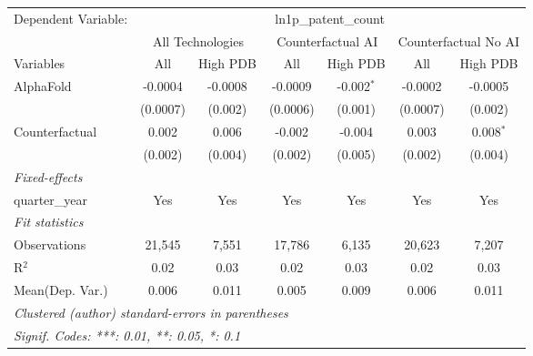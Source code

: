\begingroup
\centering
\begin{tabular}{lcccccc}
   \tabularnewline \midrule \midrule
   Dependent Variable: & \multicolumn{6}{c}{ln1p\_patent\_count}\\
 & \multicolumn{2}{c}{All Technologies} & \multicolumn{2}{c}{Counterfactual AI} & \multicolumn{2}{c}{Counterfactual No AI} \\
\cmidrule(lr){1-1}\cmidrule(lr){2-3} \cmidrule(lr){4-5} \cmidrule(lr){6-7}
Variables & \multicolumn{1}{c}{All} & \multicolumn{1}{c}{High PDB} & \multicolumn{1}{c}{All} & \multicolumn{1}{c}{High PDB} & \multicolumn{1}{c}{All} & \multicolumn{1}{c}{High PDB} \\
\cmidrule(lr){1-1}\cmidrule(lr){2-2} \cmidrule(lr){3-3} \cmidrule(lr){4-4} \cmidrule(lr){5-5} \cmidrule(lr){6-6} \cmidrule(lr){7-7}
   AlphaFold      & -0.0004  & -0.0008 & -0.0009  & -0.002$^{*}$ & -0.0002  & -0.0005\\   
                  & (0.0007) & (0.002) & (0.0006) & (0.001)      & (0.0007) & (0.002)\\   
   Counterfactual & 0.002    & 0.006   & -0.002   & -0.004       & 0.003    & 0.008$^{*}$\\   
                  & (0.002)  & (0.004) & (0.002)  & (0.005)      & (0.002)  & (0.004)\\   
   \midrule
   \emph{Fixed-effects}\\
   quarter\_year  & Yes      & Yes     & Yes      & Yes          & Yes      & Yes\\  
   \midrule
   \emph{Fit statistics}\\
   Observations   & 21,545   & 7,551   & 17,786   & 6,135        & 20,623   & 7,207\\  
   R$^2$          & 0.02     & 0.03    & 0.02     & 0.03         & 0.02     & 0.03\\  
Mean(Dep. Var.) & 0.006 & 0.011 & 0.005 & 0.009 & 0.006 & 0.011 \\
   \midrule \midrule
   \multicolumn{7}{l}{\emph{Clustered (author) standard-errors in parentheses}}\\
   \multicolumn{7}{l}{\emph{Signif. Codes: ***: 0.01, **: 0.05, *: 0.1}}\\
\end{tabular}
\par\endgroup

